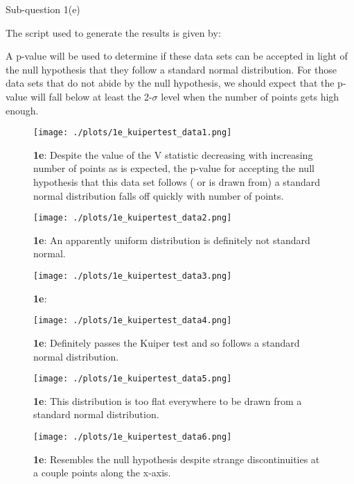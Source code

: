 \FloatBarrier

\begin{subsection}{Sub-question 1(e)}

The script used to generate the results is given by:
  


A p-value will be used to determine if these data sets can be accepted in light of the null hypothesis that they follow a standard normal distribution. For those data sets that do not abide by the null hypothesis, we should expect that the p-value will fall below at least the 2-$\sigma$ level when the number of points gets high enough. 


\begin{figure}[h!]
  \centering
  \texttt{[image: ./plots/1e\_kuipertest\_data1.png]}
  \caption{\textbf{1e}: Despite the value of the V statistic decreasing with increasing number of points as is expected, the p-value for accepting the null hypothesis that this data set follows ( or is drawn from) a standard normal distribution falls off quickly with number of points.}
\end{figure}

\begin{figure}[h!]
  \centering
  \texttt{[image: ./plots/1e\_kuipertest\_data2.png]}
  \caption{\textbf{1e}: An apparently uniform distribution is definitely not standard normal.}
\end{figure}

\begin{figure}[h!]
  \centering
  \texttt{[image: ./plots/1e\_kuipertest\_data3.png]}
  \caption{\textbf{1e}: }
\end{figure}

\begin{figure}[h!]
  \centering
  \texttt{[image: ./plots/1e\_kuipertest\_data4.png]}
  \caption{\textbf{1e}: Definitely passes the Kuiper test and so follows a standard normal distribution.}
\end{figure}

\begin{figure}[h!]
  \centering
  \texttt{[image: ./plots/1e\_kuipertest\_data5.png]}
  \caption{\textbf{1e}: This distribution is too flat everywhere to be drawn from a standard normal distribution.}
\end{figure}

\begin{figure}[h!]
  \centering
  \texttt{[image: ./plots/1e\_kuipertest\_data6.png]}
  \caption{\textbf{1e}: Resembles the null hypothesis despite strange discontinuities at a couple points along the x-axis.}
\end{figure}


\end{subsection}
